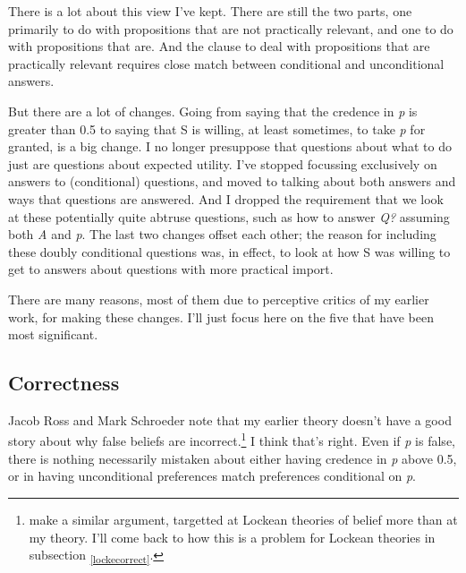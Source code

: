 \documentclass[
  11pt,
]{book}
\begin{document}
There is a lot about this view I've kept. There are still the two parts, one primarily to do with propositions that are not practically relevant, and one to do with propositions that are. And the clause to deal with propositions that are practically relevant requires close match between conditional and unconditional answers.

But there are a lot of changes. Going from saying that the credence in \emph{p} is greater than 0.5 to saying that S is willing, at least sometimes, to take \emph{p} for granted, is a big change. I no longer presuppose that questions about what to do just are questions about expected utility. I've stopped focussing exclusively on answers to (conditional) questions, and moved to talking about both answers and ways that questions are answered. And I dropped the requirement that we look at these potentially quite abtruse questions, such as how to answer \emph{Q?} assuming both \emph{A} and \emph{p}. The last two changes offset each other; the reason for including these doubly conditional questions was, in effect, to look at how S was willing to get to answers about questions with more practical import.

There are many reasons, most of them due to perceptive critics of my earlier work, for making these changes. I'll just focus here on the five that have been most significant.

\hypertarget{mecorrect}{%
\subsection{Correctness}\label{mecorrect}}

Jacob Ross and Mark Schroeder \citeyearpar{RossSchroeder2014} note that my earlier theory doesn't have a good story about why false beliefs are incorrect.\footnote{\citet{FantlMcGrath2009} make a similar argument, targetted at Lockean theories of belief more than at my theory. I'll come back to how this is a problem for Lockean theories in subsection \textsubscript{\ref{lockecorrect}}.} I think that's right. Even if \emph{p} is false, there is nothing necessarily mistaken about either having credence in \emph{p} above 0.5, or in having unconditional preferences match preferences conditional on \emph{p}.
\end{document}
